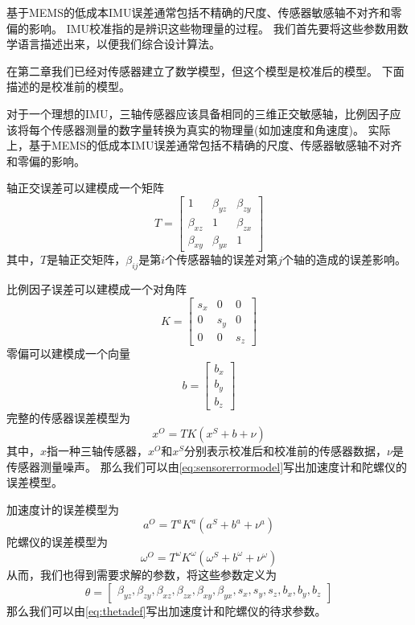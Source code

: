 \documentclass[
  type=master
]{gdutthesis}
\begin{document}
基于MEMS的低成本IMU误差通常包括不精确的尺度、传感器敏感轴不对齐和零偏的影响。
IMU校准指的是辨识这些物理量的过程。
我们首先要将这些参数用数学语言描述出来，以便我们综合设计算法。

在第二章我们已经对传感器建立了数学模型，但这个模型是校准后的模型。
下面描述的是校准前的模型。

对于一个理想的IMU，三轴传感器应该具备相同的三维正交敏感轴，比例因子应该将每个传感器测量的数字量转换为真实的物理量(如加速度和角速度)。
实际上，基于MEMS的低成本IMU误差通常包括不精确的尺度、传感器敏感轴不对齐和零偏的影响。

轴正交误差可以建模成一个矩阵
\begin{equation}\label{eq:axiserror}
	T=
	\begin{bmatrix}
		1 & \beta_{yz} & \beta_{zy}\\
		\beta_{xz} & 1 & \beta_{zx}\\
		\beta_{xy} & \beta_{yx} & 1
	\end{bmatrix}
\end{equation}
其中，$T$是轴正交矩阵，$\beta_{ij}$是第$i$个传感器轴的误差对第$j$个轴的造成的误差影响。

比例因子误差可以建模成一个对角阵
\begin{equation}\label{eq:scaleerror}
	K=
	\begin{bmatrix}
		s_x & 0 & 0\\
		0 & s_y & 0\\
		0 & 0 & s_z
	\end{bmatrix}
\end{equation}
零偏可以建模成一个向量
\begin{equation}\label{eq:scaleerror}
	b=
	\begin{bmatrix}
		b_x\\
		b_y\\
		b_z
	\end{bmatrix}
\end{equation}
完整的传感器误差模型为
\begin{equation}\label{eq:sensorerrormodel}
	x^O=T K (x^S + b + \nu)
\end{equation}
其中，$x$指一种三轴传感器，$x^O$和$x^S$分别表示校准后和校准前的传感器数据，$ν$是传感器测量噪声。
那么我们可以由\autoref{eq:sensorerrormodel}写出加速度计和陀螺仪的误差模型。

加速度计的误差模型为
\begin{equation}
	a^O=T^a K^a (a^S + b^a + \nu^a)
\end{equation}
陀螺仪的误差模型为
\begin{equation}\label{eq:accerrormodel}
	\omega^O=T^\omega K^\omega (\omega^S + b^\omega + \nu^\omega)
\end{equation}
从而，我们也得到需要求解的参数，将这些参数定义为
\begin{equation}\label{eq:thetadef}
	\theta = 
	\begin{bmatrix}
		\beta_{yz},\beta_{zy},\beta_{xz},\beta_{zx},\beta_{xy}, \beta_{yx},s_x,s_y,s_z,b_x,b_y,b_z
	\end{bmatrix}
\end{equation}
那么我们可以由\autoref{eq:thetadef}写出加速度计和陀螺仪的待求参数。
\end{document}
